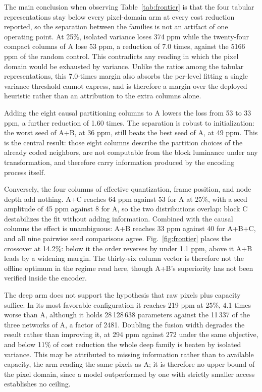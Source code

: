 \documentclass{article}
\begin{document}
The main conclusion when observing Table~\ref{tab:frontier} is that the four
tabular representations stay below every pixel-domain arm at every cost
reduction reported, so the separation between the families is not an artifact of
one operating point. At 25\%, isolated variance loses 374 ppm while the
twenty-four compact columns of A lose 53 ppm, a reduction of 7.0 times, against
the 5166 ppm of the random control. This contradicts any reading in which the
pixel domain would be exhausted by variance. Unlike the ratios among the tabular
representations, this 7.0-times margin also absorbs the per-level fitting a
single variance threshold cannot express, and is therefore a margin over the
deployed heuristic rather than an attribution to the extra columns alone.

Adding the eight causal partitioning columns to A lowers the loss from 53 to 33
ppm, a further reduction of 1.60 times. The separation is robust to
initialization: the worst seed of A+B, at 36 ppm, still beats the best seed of
A, at 49 ppm. This is the central result: those eight columns describe the
partition choices of the already coded neighbors, are not computable from the
block luminance under any transformation, and therefore carry information
produced by the encoding process itself.

Conversely, the four columns of effective quantization, frame position, and node
depth add nothing. A+C reaches 64 ppm against 53 for A at 25\%, with a seed
amplitude of 45 ppm against 8 for A, so the two distributions overlap: block C
destabilizes the fit without adding information. Combined with the causal
columns the effect is unambiguous: A+B reaches 33 ppm against 40 for A+B+C, and
all nine pairwise seed comparisons agree. Fig.~\ref{fig:frontier} places the
crossover at 14.2\%: below it the order reverses by under 1.1 ppm, above it A+B
leads by a widening margin. The thirty-six column vector is therefore not the
offline optimum in the regime read here, though A+B's superiority has not been
verified inside the encoder.

The deep arm does not support the hypothesis that raw pixels plus capacity
suffice. In its most favorable configuration it reaches 219 ppm at 25\%, 4.1
times worse than A, although it holds 28\,128\,638 parameters against the
11\,337 of the three networks of A, a factor of 2481. Doubling the fusion width
degrades the result rather than improving it, at 294 ppm against 272 under the
same objective, and below 11\% of cost reduction the whole deep family is beaten
by isolated variance. This may be attributed to missing information rather than
to available capacity, the arm reading the same pixels as A; it is therefore no
upper bound of the pixel domain, since a model outperformed by one with strictly
smaller access establishes no ceiling.
\end{document}
